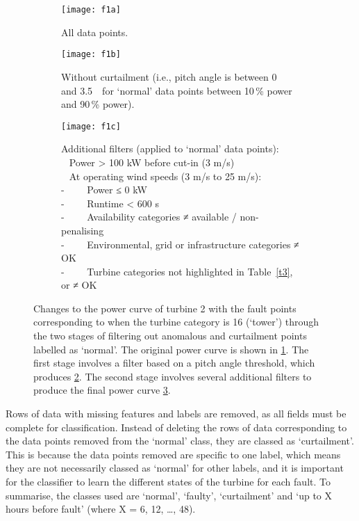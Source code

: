 \begin{figure}
    \centering
    \begin{subfigure}[t]{.5\textwidth}
        \centering
        \texttt{[image: f1a]}
        \caption{\label{f1a}All data points.}
    \end{subfigure}%
    \begin{subfigure}[t]{.5\textwidth}
        \centering
        \texttt{[image: f1b]}
        \caption{\label{f1b}Without curtailment (i.e., pitch angle is between 0\,\textdegree~ and 3.5\,\textdegree~ for `normal' data points between 10\,\% power and 90\,\% power).}
    \end{subfigure}
    \begin{subfigure}[t]{.5\textwidth}
        \centering
        \texttt{[image: f1c]}
        \caption{\label{f1c}
            Additional filters (applied to `normal' data points):\\
            \textbullet~ Power > 100 kW before cut-in (3 m/s)\\
            \textbullet~ At operating wind speeds (3 m/s to 25 m/s):\\
            -~~~~ Power ≤ 0 kW\\
            -~~~~ Runtime < 600 s\\
            -~~~~ Availability categories ≠ available / non-penalising\\
            -~~~~ Environmental, grid or infrastructure categories ≠ OK\\
            -~~~~ Turbine categories not highlighted in Table~\ref{t3}, or ≠ OK
        }
    \end{subfigure}
    \caption{\label{f1}Changes to the power curve of turbine 2 with the fault points corresponding to when the turbine category is 16 (`tower') through the two stages of filtering out anomalous and curtailment points labelled as `normal'. The original power curve is shown in \ref{f1a}. The first stage involves a filter based on a pitch angle threshold, which produces \ref{f1b}. The second stage involves several additional filters to produce the final power curve \ref{f1c}.}
\end{figure}

Rows of data with missing features and labels are removed, as all fields must be complete for classification. Instead of deleting the rows of data corresponding to the data points removed from the `normal' class, they are classed as `curtailment'. This is because the data points removed are specific to one label, which means they are not necessarily classed as `normal' for other labels, and it is important for the classifier to learn the different states of the turbine for each fault. To summarise, the classes used are `normal', `faulty', `curtailment' and `up to X hours before fault' (where X = 6, 12, \dots, 48). 

